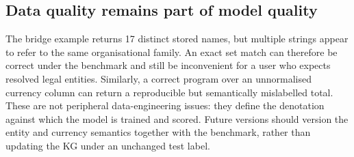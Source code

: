 \subsection{Data quality remains part of model quality}

The bridge example returns 17 distinct stored names, but multiple strings appear to refer to the
same organisational family.  An exact set match can therefore be correct under the benchmark
and still be inconvenient for a user who expects resolved legal entities.  Similarly, a correct
program over an unnormalised currency column can return a reproducible but semantically
mislabelled total.  These are not peripheral data-engineering issues: they define the denotation
against which the model is trained and scored.  Future versions should version the entity and
currency semantics together with the benchmark, rather than updating the KG under an unchanged
test label.
